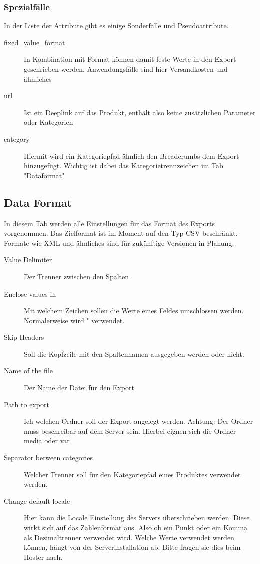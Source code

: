 \documentclass[a4paper,12pt]{book}
\begin{document}
\subsubsection{Spezialfälle}
\label{sec:special}
In der Liste der Attribute gibt es einige Sonderfälle und
Pseudoattribute.

\begin{description}

\item[fixed\_value\_format] In Kombination mit Format können damit feste
Werte in den Export geschrieben werden. Anwendungsfälle sind hier
Versandkosten und ähnliches

\item[url] Ist ein Deeplink auf das Produkt, enthält also keine
zusätzlichen Parameter oder Kategorien

\item[category] Hiermit wird ein Kategoriepfad ähnlich den Breadcrumbs
dem Export hinzugefügt. Wichtig ist dabei das Kategorietrennzeichen im
Tab "Dataformat"
\end{description}

\subsection{Data Format}
In diesem Tab werden alle Einstellungen für das Format des Exports
vorgenommen. Das Zielformat ist im Moment auf den Typ CSV beschränkt.
Formate wie XML und ähnliches sind für zukünftige Versionen in
Planung.

\begin{description}
\item[Value Delimiter] Der Trenner zwischen den Spalten
\item[Enclose values in] Mit welchem Zeichen sollen die Werte eines
Feldes umschlossen werden. Normalerweise wird " verwendet.
\item[Skip Headers] Soll die Kopfzeile mit den Spaltennamen ausgegeben
werden oder nicht.
\item[Name of the file] Der Name der Datei für den Export
\item[Path to export] Ich welchen Ordner soll der Export angelegt
werden. Achtung: Der Ordner muss beschreibar auf dem Server sein.
Hierbei eignen sich die Ordner media oder var
\item[Separator between categories] Welcher Trenner soll für den
Kategoriepfad eines Produktes verwendet werden.
\item[Change default locale] Hier kann die Locale Einstellung des
Servers überschrieben werden. Diese wirkt sich auf das Zahlenformat
aus. Also ob ein Punkt oder ein Komma als Dezimaltrenner verwendet
wird. Welche Werte verwendet werden können, hängt von der
Serverinstallation ab. Bitte fragen sie dies beim Hoster nach.
\end{description}
\end{document}
